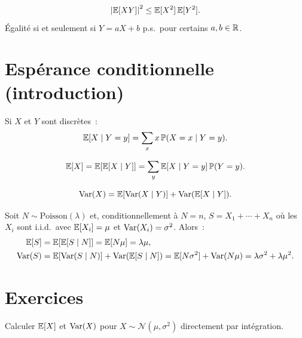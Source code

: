 \begin{theoreme}
\label{thm:cauchy_schwarz}
\[
    \left| \mathbb{E}[XY] \right|^2 \leq \mathbb{E}[X^2]\, \mathbb{E}[Y^2].
\]
\'Egalit\'e si et seulement si $Y = aX + b$ p.s.\ pour certains $a, b \in \mathbb{R}$.
\end{theoreme}

\section{Esp\'erance conditionnelle (introduction)}

\begin{definition}
Si $X$ et $Y$ sont discr\`etes~:
\[
    \mathbb{E}[X \mid Y = y] = \sum_x x\, \mathbb{P}(X = x \mid Y = y).
\]
\end{definition}

\begin{theoreme}
\[
    \mathbb{E}[X] = \mathbb{E}[\mathbb{E}[X \mid Y]] = \sum_y \mathbb{E}[X \mid Y = y]\, \mathbb{P}(Y = y).
\]
\end{theoreme}

\begin{theoreme}
\[
    \mathrm{Var}(X) = \mathbb{E}[\mathrm{Var}(X \mid Y)] + \mathrm{Var}(\mathbb{E}[X \mid Y]).
\]
\end{theoreme}

\begin{exemple}
Soit $N \sim \text{Poisson}(\lambda)$ et, conditionnellement \`a $N = n$,
$S = X_1 + \cdots + X_n$ o\`u les $X_i$ sont i.i.d.\ avec $\mathbb{E}[X_i] = \mu$
et $\mathrm{Var}(X_i) = \sigma^2$. Alors~:
\begin{align*}
    \mathbb{E}[S] &= \mathbb{E}[\mathbb{E}[S \mid N]] = \mathbb{E}[N\mu] = \lambda\mu, \\
    \mathrm{Var}(S) &= \mathbb{E}[\mathrm{Var}(S \mid N)] + \mathrm{Var}(\mathbb{E}[S \mid N])
    = \mathbb{E}[N\sigma^2] + \mathrm{Var}(N\mu) = \lambda\sigma^2 + \lambda\mu^2.
\end{align*}
\end{exemple}

\section{Exercices}

\begin{exercice}
Calculer $\mathbb{E}[X]$ et $\mathrm{Var}(X)$ pour $X \sim \mathcal{N}(\mu, \sigma^2)$ directement
par int\'egration.
\end{exercice}

